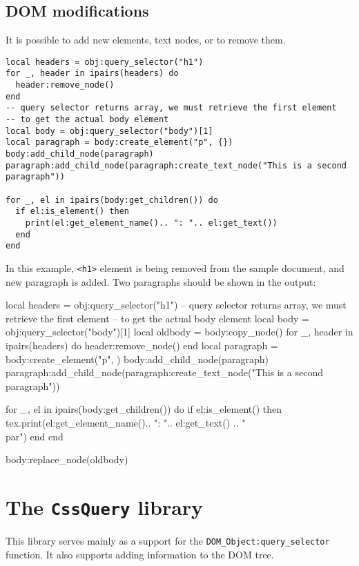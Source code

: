 \documentclass{ltxdoc}
\begin{document}
\subsection{DOM modifications}

It is possible to add new elements, text nodes, or to remove them. 

\begin{verbatim}
local headers = obj:query_selector("h1")
for _, header in ipairs(headers) do
  header:remove_node()
end
-- query selector returns array, we must retrieve the first element
-- to get the actual body element
local body = obj:query_selector("body")[1]
local paragraph = body:create_element("p", {})
body:add_child_node(paragraph)
paragraph:add_child_node(paragraph:create_text_node("This is a second paragraph"))

for _, el in ipairs(body:get_children()) do
  if el:is_element() then
    print(el:get_element_name().. ": ".. el:get_text())
  end
end
\end{verbatim}

In this example, \verb|<h1>| element is being removed from the sample document, and new 
paragraph is added. Two paragraphs should be shown in the output:

\begin{framed}
  \begin{luacode*}
local headers = obj:query_selector("h1")
-- query selector returns array, we must retrieve the first element
-- to get the actual body element
local body = obj:query_selector("body")[1]
local oldbody = body:copy_node()
for _, header in ipairs(headers) do
  header:remove_node()
end
local paragraph = body:create_element("p", {})
body:add_child_node(paragraph)
paragraph:add_child_node(paragraph:create_text_node("This is a second paragraph"))

for _, el in ipairs(body:get_children()) do
if el:is_element() then
  tex.print(el:get_element_name().. ": ".. el:get_text() .. "\\par")
end
end

body:replace_node(oldbody)
  \end{luacode*}
\end{framed}


\section{The \texttt{CssQuery} library}
\label{sec:cssquery_library}

This library serves mainly as a support for the
\texttt{DOM\_Object:query\_selector} function. It also supports adding
information to the DOM tree.
\end{document}

